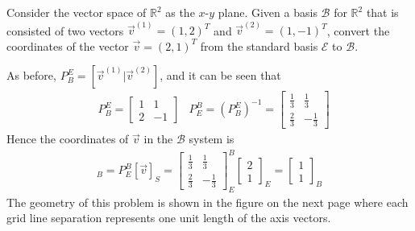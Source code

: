 \begin{exmp}
\label{exmp:2Dtransform}
Consider the vector space of $\mathbb{R}^2$ as the $x$-$y$ plane. Given a basis $\mathcal{B}$ for $\mathbb{R}^2$ that is consisted of two vectors $\vec{v}^{(1)} = (1,2)^T$ and $\vec{v}^{(2)} = (1,-1)^T$, convert the coordinates of the vector $\vec{v} = (2,1)^T$ from the standard basis $\mathcal{E}$ to $\mathcal{B}$.
\end{exmp}
\begin{solution}
As before, $P_B^E = [\vec{v}^{(1)}|\vec{v}^{(2)}]$, and it can be seen that
\begin{align*}
&P_B^E =
\begin{bmatrix}
1 & 1 \\
2 & -1
\end{bmatrix}
&P_E^B = (P_B^E)^{-1} =
\begin{bmatrix}
\frac{1}{3} & \frac{1}{3} \\
\frac{2}{3} & -\frac{1}{3}
\end{bmatrix}
\end{align*}
Hence the coordinates of $\vec{v}$ in the $\mathcal{B}$ system is
\begin{align*}
[\vec{v}]_B = P_E^B[\vec{v}]_S = 
\begin{bmatrix}
\frac{1}{3} & \frac{1}{3} \\
\frac{2}{3} & -\frac{1}{3}
\end{bmatrix}_E^B
\begin{bmatrix}
2 \\
1
\end{bmatrix}_E
=
\begin{bmatrix}
1\\
1
\end{bmatrix}_B
\end{align*}
The geometry of this problem is shown in the figure on the next page where each grid line separation represents one unit length of the axis vectors.
\begin{figure}
\centering
{}
\end{figure}
\end{solution}

